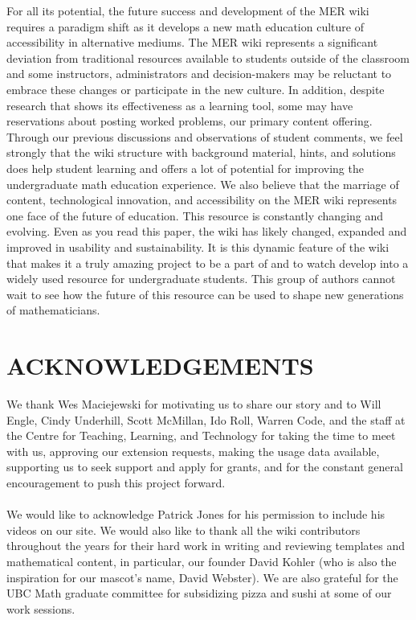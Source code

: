 \documentclass{primus}
\begin{document}
\noindent{}For all its potential, the future success and development of the MER wiki requires a paradigm shift as it develops a new math education culture of accessibility in alternative mediums. The MER wiki represents a significant deviation from traditional resources available to students outside of the classroom and some instructors, administrators and decision-makers may be reluctant to embrace these changes or participate in the new culture. In addition, despite research that shows its effectiveness as a learning tool, some may have reservations about posting worked problems, our primary content offering.  Through our previous discussions and observations of student comments, we feel strongly that the wiki structure with background material, hints, and solutions does help student learning and offers a lot of potential for improving the undergraduate math education experience.  We also believe that the marriage of content, technological innovation, and accessibility on the MER wiki represents one face of the future of education.  
This resource is constantly changing and evolving. Even as you read this paper, the wiki has likely changed, expanded and improved in usability and sustainability. It is this dynamic feature of the wiki that makes it a truly amazing project to be a part of and to watch develop into a widely used resource for undergraduate students. This group of authors cannot wait to see how the future of this resource can be used to shape new generations of mathematicians.

\section{ACKNOWLEDGEMENTS}\label{sec:Acknowledgements}

We thank Wes Maciejewski for motivating us to share our story and to Will Engle, Cindy Underhill, Scott McMillan, Ido Roll, Warren Code, and the staff at the Centre for Teaching, Learning, and Technology for taking the time to meet with us, approving our extension requests, making the usage data available, supporting us to seek support and apply for grants, and for the constant general encouragement to push this project forward.
\\\\
\noindent{}We would like to acknowledge Patrick Jones for his permission to include his videos on our site.  We would also like to thank all the wiki contributors throughout the years for their hard work in writing and reviewing templates and mathematical content, in particular, our founder David Kohler (who is also the inspiration for our mascot’s name, David Webster).  We are also grateful for the UBC Math graduate committee for subsidizing pizza and sushi at some of our work sessions.
\end{document}
